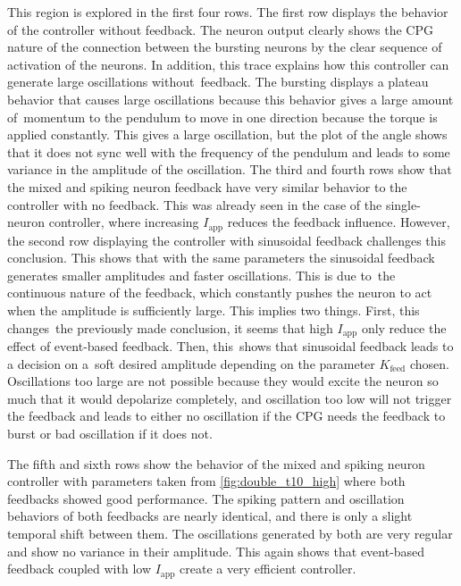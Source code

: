 This region is explored in the first four rows.
The first row displays the behavior of the controller without feedback.
The neuron output clearly shows the CPG nature of the connection between the bursting neurons by the clear sequence of activation of the neurons.
In addition, this trace explains how this controller can generate large oscillations without feedback.
The bursting displays a plateau behavior that causes large oscillations because this behavior gives a large amount of momentum to the pendulum to move in one direction because the torque is applied constantly.
This gives a large oscillation, but the plot of the angle shows that it does not sync well with the frequency of the pendulum and leads to some variance in the amplitude of the oscillation.
The third and fourth rows show that the mixed and spiking neuron feedback have very similar behavior to the controller with no feedback.
This was already seen in the case of the single-neuron controller, where increasing $I_\text{app}$ reduces the feedback influence.
However, the second row displaying the controller with sinusoidal feedback challenges this conclusion.
This shows that with the same parameters the sinusoidal feedback generates smaller amplitudes and faster oscillations.
This is due to the continuous nature of the feedback, which constantly pushes the neuron to act when the amplitude is sufficiently large.
This implies two things.
First, this changes the previously made conclusion, it seems that high $I_\text{app}$ only reduce the effect of event-based feedback.
Then, this shows that sinusoidal feedback leads to a decision on a soft desired amplitude depending on the parameter $K_\text{feed}$ chosen.
Oscillations too large are not possible because they would excite the neuron so much that it would depolarize completely, and oscillation too low will not trigger the feedback and leads to either no oscillation if the CPG needs the feedback to burst or bad oscillation if it does not.

The fifth and sixth rows show the behavior of the mixed and spiking neuron controller with parameters taken from \cref{fig:double_t10_high} where both feedbacks showed good performance.
The spiking pattern and oscillation behaviors of both feedbacks are nearly identical, and there is only a slight temporal shift between them.
The oscillations generated by both are very regular and show no variance in their amplitude.
This again shows that event-based feedback coupled with low $I_\text{app}$ create a very efficient controller.


